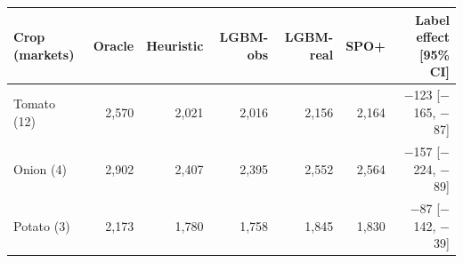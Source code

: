 \begin{tabular}{lrrrrrr}
\toprule
Crop (markets) & Oracle & Heuristic & LGBM-obs & LGBM-real & SPO+ & Label effect [95\% CI]\\
\midrule
Tomato (12) & 2{,}570 & 2{,}021 & 2{,}016 & 2{,}156 & 2{,}164 & $-$123 [$-$165, $-$87]\\
Onion (4) & 2{,}902 & 2{,}407 & 2{,}395 & 2{,}552 & 2{,}564 & $-$157 [$-$224, $-$89]\\
Potato (3) & 2{,}173 & 1{,}780 & 1{,}758 & 1{,}845 & 1{,}830 & $-$87 [$-$142, $-$39]\\
\bottomrule
\end{tabular}